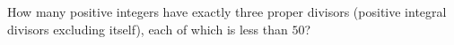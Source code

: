 How many positive integers have exactly three proper divisors (positive integral divisors excluding itself), each of which is less than $50$?
